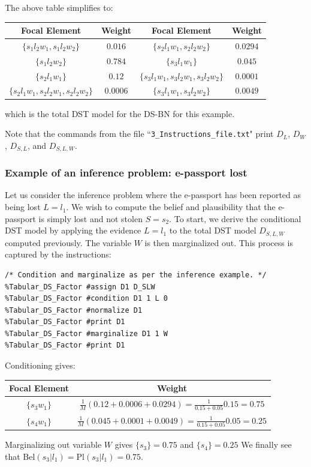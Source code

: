 \documentclass{article}
\begin{document}
The above table simplifies to:
\begin{center}
\begin{small}
\begin{tabular}{|c|c||c|c|}
\hline
Focal Element & Weight &Focal Element & Weight \\
\hline
\(\{s_1l_2w_1, s_1l_2w_2\}\) & \(0.016\) &\(\{s_2l_1w_1, s_2l_2w_2\}\) & \(0.0294\) \\
\(\{s_1l_2w_2\}\) & \(0.784\) &\(\{s_3l_1w_1\}\) & \(0.045\)\\
\(\{s_2l_1w_1\}\) & \(0.12\) &\(\{s_3l_1w_1, s_3l_2w_1, s_3l_2w_2\}\) & \(0.0001\)\\
\(\{s_2l_1w_1, s_2l_2w_1, s_2l_2w_2\}\) & \(0.0006\) &\(\{s_3l_1w_1, s_3l_2w_2\}\) & \(0.0049\)\\
\hline
\end{tabular}
\end{small}
\end{center}
which is the total DST model for the DS-BN for this example.

Note that the commands from the file ``\texttt{3\_Instructions\_file.txt}" print \(D_L\), \(D_W\), \(D_{S,L}\), and \(D_{S,L,W}\). 

\subsubsection{Example of an inference problem: e-passport lost}

Let us consider the inference problem where the e-passport has been reported as being lost \(L = l_1\). We wish to compute the belief and plausibility that the e-passport is simply lost and not stolen \(S = s_2\).
To start, we derive the conditional DST model by applying the evidence \(L = l_1\) to the total DST model \(D_{S,L,W}\) computed previously. The variable \(W\) is then marginalized out. This process is captured by the instructions:
\begin{verbatim}
/* Condition and marginalize as per the inference example. */
%Tabular_DS_Factor #assign D1 D_SLW
%Tabular_DS_Factor #condition D1 1 L 0
%Tabular_DS_Factor #normalize D1
%Tabular_DS_Factor #print D1
%Tabular_DS_Factor #marginalize D1 1 W
%Tabular_DS_Factor #print D1
\end{verbatim}
Conditioning gives:
\begin{center}
\begin{small}
\begin{tabular}{|c|c|}
\hline
Focal Element & Weight \\
\hline
\(\{s_3w_1\}\) & \(\frac{1}{M}(0.12 + 0.0006 + 0.0294) = \frac{1}{0.15 + 0.05}0.15 = 0.75\) \\
\(\{s_4w_1\}\) & \(\frac{1}{M}(0.045 + 0.0001 + 0.0049) = \frac{1}{0.15 + 0.05}0.05 = 0.25\) \\
\hline
\end{tabular}
\end{small}
\end{center}
Marginalizing out variable \(W\) gives $\{s_3\}=0.75$ and $\{s_4\}=0.25$
We finally see that \(\text{Bel}(s_3|l_1) = \text{Pl}(s_3|l_1) = 0.75.\)
\end{document}
